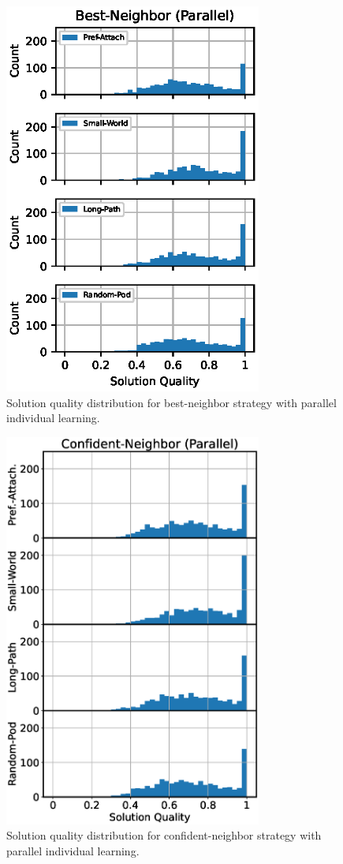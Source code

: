 \begin{figure}
    \centering
    \includegraphics[width=3.33in]{chapters/figures/NetDelibABM/results-bn-parallel-dist.eps}
	\caption{Solution quality distribution for best-neighbor strategy with parallel individual learning.}
\end{figure}
    \label{fig:results-bn-parallel-dist}

\begin{figure}
    \centering
    \includegraphics[width=3.33in]{chapters/figures/NetDelibABM/results-cn-parallel-dist.eps}
	\caption{Solution quality distribution for confident-neighbor strategy with parallel individual learning.}
    \label{fig:results-cn-parallel-dist}
\end{figure}

